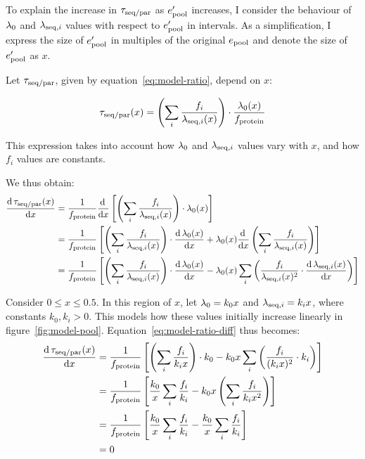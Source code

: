 To explain the increase in $\tau_{\mathrm{seq}/\mathrm{par}}$ as $e_{\mathrm{pool}}^{\prime}$ increases, I consider the behaviour of $\lambda_{0}$ and $\lambda_{\mathrm{seq},i}$ values with respect to $e_{\mathrm{pool}}^{\prime}$ in intervals.
As a simplification, I express the size of $e_{\mathrm{pool}}^{\prime}$ in multiples of the original $e_{\mathrm{pool}}$ and denote the size of $e_{\mathrm{pool}}^{\prime}$ as $x$.

Let $\tau_{\mathrm{seq}/\mathrm{par}}$, given by equation~\ref{eq:model-ratio}, depend on $x$:

\begin{equation}
  \label{eq:model-ratio-x}
  \tau_{\mathrm{seq}/\mathrm{par}}(x) = \left( \sum_i \frac{f_i}{\lambda_{\mathrm{seq},i}(x)} \right) \cdot \frac{\lambda_{0}(x)}{f_{\mathrm{protein}}}
\end{equation}

This expression takes into account how $\lambda_{0}$ and $\lambda_{\mathrm{seq},i}$ values vary with $x$, and how $f_{i}$ values are constants.

We thus obtain:
\begin{equation}
  \begin{aligned}
  \frac{\mathrm{d} \, \tau_{\mathrm{seq}/\mathrm{par}}(x)}{\mathrm{d} x} &= \frac{1}{f_{\mathrm{protein}}} \frac{\mathrm{d} \, }{\mathrm{d} x} \left[ \left( \sum_i \frac{f_i}{\lambda_{\mathrm{seq},i}(x)} \right) \cdot \lambda_{0}(x) \right]\\
  &= \frac{1}{f_{\mathrm{protein}}} \left[ \left( \sum_i \frac{f_i}{\lambda_{\mathrm{seq},i}(x)} \right) \cdot \frac{\mathrm{d} \, \lambda_{0}(x)}{\mathrm{d} x} + \lambda_{0}(x) \frac{\mathrm{d} \, }{\mathrm{d} x} \left( \sum_i \frac{f_i}{\lambda_{\mathrm{seq},i}(x)} \right) \right]\\
  &= \frac{1}{f_{\mathrm{protein}}} \left[ \left( \sum_i \frac{f_i}{\lambda_{\mathrm{seq},i}(x)} \right) \cdot \frac{\mathrm{d} \, \lambda_{0}(x)}{\mathrm{d} x} - \lambda_{0}(x) \sum_{i}\left( \frac{f_{i}}{\lambda_{\mathrm{seq},i}(x)^{2}} \cdot \frac{\mathrm{d} \, \lambda_{\mathrm{seq},i}(x)}{\mathrm{d} x} \right) \right]
  \end{aligned}
  \label{eq:model-ratio-diff}
\end{equation}

Consider $0 \leq x \leq 0.5$.
In this region of $x$, let $\lambda_{0} = k_{0}x$ and $\lambda_{\mathrm{seq},i} = k_{i}x$, where constants $k_{0}, k_{i} > 0$.
This models how these values initially increase linearly in figure~\ref{fig:model-pool}.
Equation~\ref{eq:model-ratio-diff} thus becomes:
\begin{equation}
  \begin{aligned}
  \frac{\mathrm{d} \, \tau_{\mathrm{seq}/\mathrm{par}}(x)}{\mathrm{d} x} &= \frac{1}{f_{\mathrm{protein}}} \left[ \left( \sum_i \frac{f_i}{k_{i}x} \right) \cdot k_{0} - k_{0}x \sum_{i}\left( \frac{f_{i}}{(k_{i}x)^{2}} \cdot k_{i} \right) \right]\\
  &= \frac{1}{f_{\mathrm{protein}}} \left[ \frac{k_{0}}{x} \sum_i \frac{f_i}{k_{i}} - k_{0}x \left( \sum_{i} \frac{f_{i}}{k_{i}x^{2}} \right) \right]\\
  &= \frac{1}{f_{\mathrm{protein}}} \left[ \frac{k_{0}}{x} \sum_i \frac{f_i}{k_{i}} - \frac{k_{0}}{x} \sum_i \frac{f_i}{k_{i}} \right]\\
  &= 0
  \end{aligned}
  \label{eq:model-ratio-diff-smallx}
\end{equation}


